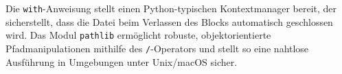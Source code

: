 Die \texttt{with}-Anweisung stellt einen Python-typischen Kontextmanager bereit, der sicherstellt, dass die Datei beim Verlassen des Blocks automatisch geschlossen wird. Das Modul \texttt{pathlib} ermöglicht robuste, objektorientierte Pfadmanipulationen mithilfe des \texttt{/}-Operators und stellt so eine nahtlose Ausführung in Umgebungen unter Unix/macOS sicher.

